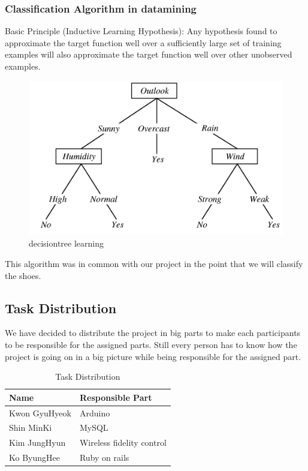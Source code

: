 \documentclass[conference]{IEEEtran}
\begin{document}
\subsubsection{Classification Algorithm in datamining}
Basic Principle (Inductive Learning Hypothesis): Any hypothesis found to approximate the target function well over a sufficiently large set of training examples will also approximate the target function well over other unobserved examples.
\begin{figure}[h]
\begin{center}
    \includegraphics[scale=0.5]{decisiontree_learning}
    \caption{decisiontree learning} \label{fig:label}
\end{center}
\end{figure}

This algorithm was in common with our project in the point that we will classify the shoes. 
\\

\subsection{Task Distribution}
We have decided to distribute the project in big parts to make each participants to be responsible for the assigned parts. Still every person has to know how the project is going on in a big picture while being responsible for the assigned part.
\begin{table}[h]
\renewcommand{\arrayrulewidth}{1pt}
\renewcommand{\arraystretch}{2.5}
\begin{tabular}
{|p{4cm}|p{4cm}|}\hline
Name & Responsible Part\\ \hline
Kwon GyuHyeok&Arduino\\ \hline
Shin MinKi&MySQL\\ \hline
Kim JungHyun&Wireless fidelity control\\ \hline
Ko ByungHee&Ruby on rails\\ \hline
\end{tabular}
\\
\\
\caption{Task Distribution}
\label{tab:template}
\end{table}
\\
\\
\\
\\
\\
\\
\\
\end{document}
